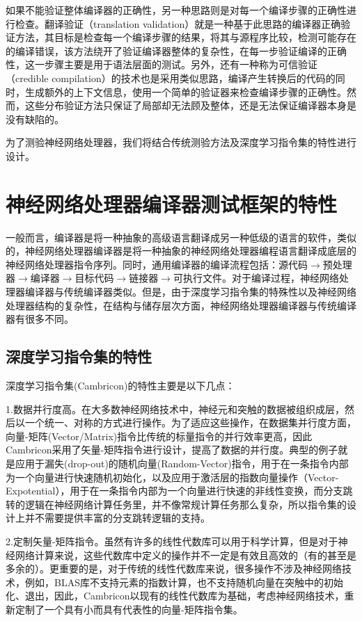如果不能验证整体编译器的正确性，另一种思路则是对每一个编译步骤的正确性进行检查。翻译验证\cite{pnueli1998translation}（translation validation）就是一种基于此思路的编译器正确验证方法，其目标是检查每一个编译步骤的结果，将其与源程序比较，检测可能存在的编译错误，该方法绕开了验证编译器整体的复杂性，在每一步验证编译的正确性，这一步骤主要是用于语法层面的测试。另外，还有一种称为可信验证（credible compilation）\cite{rinard2003credible}的技术也是采用类似思路，编译产生转换后的代码的同时，生成额外的上下文信息，使用一个简单的验证器来检查编译步骤的正确性。然而，这些分布验证方法只保证了局部却无法顾及整体，还是无法保证编译器本身是没有缺陷的。

为了测验神经网络处理器，我们将结合传统测验方法及深度学习指令集的特性进行设计。

\section{神经网络处理器编译器测试框架的特性}

一般而言，编译器是将一种抽象的高级语言翻译成另一种低级的语言的软件，类似的，神经网络处理器编译器是将一种抽象的神经网络处理器编程语言翻译成底层的神经网络处理器指令序列。同时，通用编译器的编译流程包括：源代码$\rightarrow$预处理器$\rightarrow$编译器$\rightarrow$目标代码$\rightarrow$链接器$\rightarrow$可执行文件。对于编译过程，神经网络处理器编译器与传统编译器类似。但是，由于深度学习指令集的特殊性以及神经网络处理器结构的复杂性，在结构与储存层次方面，神经网络处理器编译器与传统编译器有很多不同。

\subsection{深度学习指令集的特性}
深度学习指令集(Cambricon)的特性主要是以下几点\cite{liu2016cambricon}：

1.数据并行度高。在大多数神经网络技术中，神经元和突触的数据被组织成层，然后以一个统一、对称的方式进行操作。为了适应这些操作，在数据集并行度方面，向量-矩阵(Vector/Matrix)指令比传统的标量指令的并行效率更高，因此Cambricon采用了矢量-矩阵指令进行设计，提高了数据的并行度。典型的例子就是应用于漏失(drop-out)的随机向量(Random-Vector)指令，用于在一条指令内部为一个向量进行快速随机初始化，以及应用于激活层的指数向量操作（Vector-Expotential），用于在一条指令内部为一个向量进行快速的非线性变换，而分支跳转的逻辑在神经网络计算任务里，并不像常规计算任务那么复杂，所以指令集的设计上并不需要提供丰富的分支跳转逻辑的支持。

2.定制矢量-矩阵指令。虽然有许多的线性代数库可以用于科学计算，但是对于神经网络计算来说，这些代数库中定义的操作并不一定是有效且高效的（有的甚至是多余的）。更重要的是，对于传统的线性代数库来说，很多操作不涉及神经网络技术，例如，BLAS库不支持元素的指数计算，也不支持随机向量在突触中的初始化、退出，因此，Cambricon以现有的线性代数库为基础，考虑神经网络技术，重新定制了一个具有小而具有代表性的向量-矩阵指令集。

